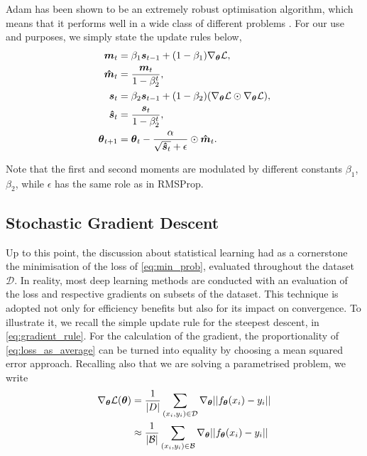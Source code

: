 Adam has been shown to be an extremely robust optimisation algorithm, which means that it performs well in a wide class of different problems \cite{reyad2023modified, zhang2022adam}. For our use and purposes, we simply state the update rules below,
\begin{align*}
    \boldsymbol{m}_t &= \beta_1 \boldsymbol{s}_{t-1}  + (1- 
    \beta_1)\nabla_{\boldsymbol{\theta}} \mathcal{L}, \\
    \boldsymbol{\hat{m}}_t &=  \frac{\boldsymbol{m}_t}{1- \beta_2^t}, \\
    \boldsymbol{s}_t &= \beta_2 \boldsymbol{s}_{t-1}  + (1- \beta_2)(\nabla_{\boldsymbol{\theta}} \mathcal{L}\odot \nabla_{\boldsymbol{\theta}} \mathcal{L}), \\
    \boldsymbol{\hat{s}}_t &= \frac{\boldsymbol{s}_t}{1- \beta_2^t}, \\
    \boldsymbol{\theta}_{t+1} &= \boldsymbol{\theta}_{t} - \frac{\alpha}{\sqrt{\boldsymbol{\hat{s}}_t} + \epsilon} \odot \boldsymbol{\hat{m}}_t.
\end{align*}

Note that the first and second moments are modulated by different constants $\beta_1$, $\beta_2$, while $\epsilon$ has the same role as in RMSProp.

\subsection{Stochastic Gradient Descent}\label{section:sgd} 

Up to this point, the discussion about statistical learning had as a cornerstone the minimisation of the loss of \eqref{eq:min_prob}, evaluated throughout the dataset $\mathcal{D}$. In reality, most deep learning methods are conducted with an evaluation of the loss and respective gradients on subsets of the dataset. This technique is adopted not only for efficiency benefits but also for its impact on convergence. To illustrate it, we recall the simple update rule for the steepest descent, in \eqref{eq:gradient_rule}. For the calculation of the gradient, the proportionality of \eqref{eq:loss_as_average} can be turned into equality by choosing a mean squared error approach. Recalling also that we are solving a parametrised problem, we write
\begin{align}
    \nabla_{\boldsymbol{\theta}} \mathcal{L}(\boldsymbol{\theta}) &= \frac{1}{\left| D\right|}\sum_{(x_i, y_i) \in \mathcal{D}} \nabla_{\boldsymbol{\theta}} ||f_{\boldsymbol{\theta}}(x_i) - y_i || \label{eq:normal_gd}\\
    &\approx \frac{1}{\left| \mathcal{B}\right|}\sum_{(x_i, y_i) \in \mathcal{B}} \nabla_{\boldsymbol{\theta}} ||f_{\boldsymbol{\theta}}(x_i) - y_i || \label{eq:batch_gd}
\end{align}

